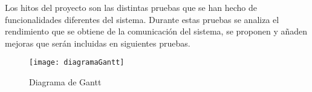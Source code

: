Los hitos del proyecto son las distintas pruebas que se han hecho de funcionalidades diferentes del
sistema. Durante estas pruebas se analiza el rendimiento que se obtiene de la comunicación del sistema,
se proponen y añaden mejoras que serán incluidas en siguientes pruebas.

\begin{figure}[t]
	 {
		\texttt{[image: diagramaGantt]}
	}
	\caption{Diagrama de Gantt}
	\label{fig:gantt}
\end{figure}
